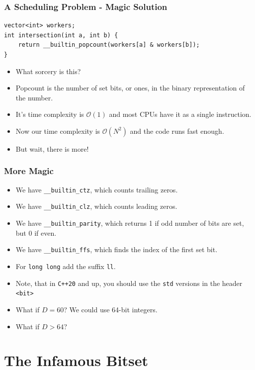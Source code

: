 \documentclass[10pt]{beamer}
\begin{document}
\begin{frame}
	\frametitle{A Scheduling Problem - Magic Solution}
    \begin{scriptsize}
        \begin{verbatim}
vector<int> workers;
int intersection(int a, int b) {
    return __builtin_popcount(workers[a] & workers[b]);
}
        \end{verbatim}
    \end{scriptsize}
    \begin{itemize}
        \item What sorcery is this?
        \item<2-> Popcount is the number of set bits, or ones, in the binary representation of the number.
        \item<3-> It's time complexity is $\mathcal{O}(1)$ and most CPUs have it as a single instruction.
        \item<4-> Now our time complexity is $\mathcal{O}(N^2)$ and the code runs fast enough.
        \item<5-> But wait, there is more!
    \end{itemize}
\end{frame}

\begin{frame}[plain]
    \frametitle{More Magic}
    \begin{itemize}
        \item<1-> We have \texttt{\_\_builtin\_ctz}, which counts trailing zeros.
        \item<2-> We have \texttt{\_\_builtin\_clz}, which counts leading zeros.
        \item<3-> We have \texttt{\_\_builtin\_parity}, which returns 1 if odd number of bits are set, but 0 if even.
        \item<4-> We have \texttt{\_\_builtin\_ffs}, which finds the index of the first set bit.
        \item<5-> For \texttt{long long} add the suffix \texttt{ll}.
        \item<6-> Note, that in \texttt{C++20} and up, you should use the \texttt{std} versions in the header \texttt{<bit>}
        \item<7-> What if $D = 60$? We could use 64-bit integers.
        \item<8-> What if $D > 64$?
    \end{itemize}
\end{frame}

\section*{The Infamous Bitset}
\end{document}
